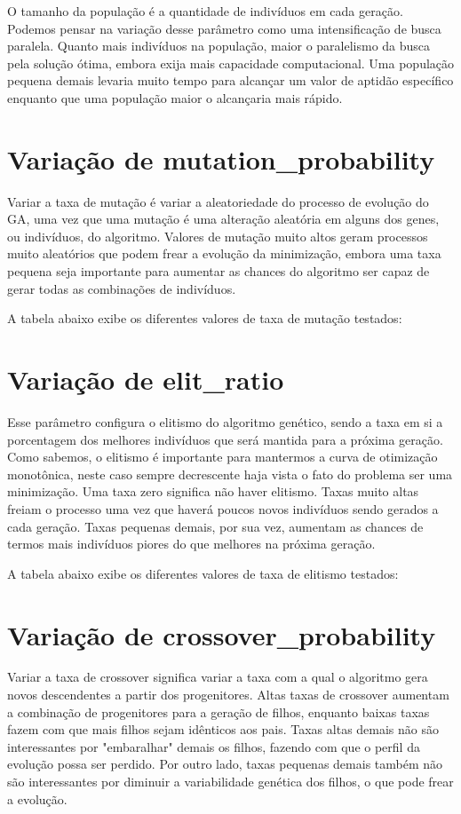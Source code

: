 \documentclass[12pt]{article}
\begin{document}
O tamanho da população é a quantidade de indivíduos em cada geração. Podemos pensar na variação desse parâmetro como uma intensificação de busca paralela. Quanto mais indivíduos na população, maior o paralelismo da busca pela solução ótima, embora exija mais capacidade computacional. Uma população pequena demais levaria muito tempo para alcançar um valor de aptidão específico enquanto que uma população maior o alcançaria mais rápido.

\section{Variação de mutation\_probability}

Variar a taxa de mutação é variar a aleatoriedade do processo de evolução do GA, uma vez que uma mutação é uma alteração aleatória em alguns dos genes, ou indivíduos, do algoritmo. Valores de mutação muito altos geram processos muito aleatórios que podem frear a evolução da minimização, embora uma taxa pequena seja importante para aumentar as chances do algoritmo ser capaz de gerar todas as combinações de indivíduos.

A tabela abaixo exibe os diferentes valores de taxa de mutação testados:

\section{Variação de elit\_ratio}

Esse parâmetro configura o elitismo do algoritmo genético, sendo a taxa em si a porcentagem dos melhores indivíduos que será mantida para a próxima geração. Como sabemos, o elitismo é importante para mantermos a curva de otimização monotônica, neste caso sempre decrescente haja vista o fato do problema ser uma minimização. Uma taxa zero significa não haver elitismo. Taxas muito altas freiam o processo uma vez que haverá poucos novos indivíduos sendo gerados a cada geração. Taxas pequenas demais, por sua vez, aumentam as chances de termos mais indivíduos piores do que melhores na próxima geração.

A tabela abaixo exibe os diferentes valores de taxa de elitismo testados:

\section{Variação de crossover\_probability}

Variar a taxa de crossover significa variar a taxa com a qual o algoritmo gera novos descendentes a partir dos progenitores. Altas taxas de crossover aumentam a combinação de progenitores para a geração de filhos, enquanto baixas taxas fazem com que mais filhos sejam idênticos aos pais. Taxas altas demais não são interessantes por "embaralhar" demais os filhos, fazendo com que o perfil da evolução possa ser perdido. Por outro lado, taxas pequenas demais também não são interessantes por diminuir a variabilidade genética dos filhos, o que pode frear a evolução.
\end{document}
